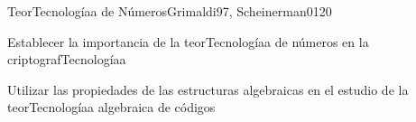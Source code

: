 \begin{syllabus}
\begin{unit}{TeorTecnologíaa de Números}{Grimaldi97, Scheinerman01}{20}
   \begin{unitgoals}
      \item Establecer la importancia de la teorTecnologíaa de números en la criptografTecnologíaa
      \item Utilizar las propiedades de las estructuras algebraicas en el estudio de la teorTecnologíaa algebraica de códigos
   \end{unitgoals}
\end{unit}

\begin{coursebibliography}
\end{coursebibliography}

\end{syllabus}

%
